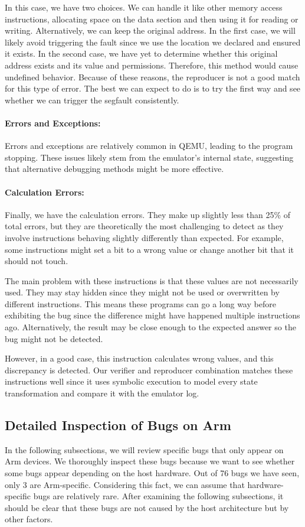 In this case, we have two choices.
We can handle it like other memory access instructions, allocating space on the data section and then using it for reading or writing.
Alternatively, we can keep the original address.
In the first case, we will likely avoid triggering the fault since we use the location we declared and ensured it exists.
In the second case, we have yet to determine whether this original address exists and its value and permissions.
Therefore, this method would cause undefined behavior.
Because of these reasons, the reproducer is not a good match for this type of error.
The best we can expect to do is to try the first way and see whether we can trigger the \ac{segfault} consistently.

\paragraph{Errors and Exceptions:}
Errors and exceptions are relatively common in \ac{QEMU}, leading to the program stopping. These issues likely stem from the emulator's internal state, suggesting that alternative debugging methods might be more effective.

\paragraph{Calculation Errors:}
Finally, we have the calculation errors.
They make up slightly less than 25\% of total errors, but they are theoretically the most challenging to detect as they involve instructions behaving slightly differently than expected.
For example, some instructions might set a bit to a wrong value or change another bit that it should not touch.

The main problem with these instructions is that these values are not necessarily used.
They may stay hidden since they might not be used or overwritten by different instructions.
This means these programs can go a long way before exhibiting the bug since the difference might have happened multiple instructions ago.
Alternatively, the result may be close enough to the expected answer so the bug might not be detected.

However, in a good case, this instruction calculates wrong values, and this discrepancy is detected.
Our verifier and reproducer combination matches these instructions well since it uses symbolic execution to model every state transformation and compare it with the emulator log.

\subsection{Detailed Inspection of Bugs on Arm}
In the following subsections, we will review specific bugs that only appear on Arm devices.
We thoroughly inspect these bugs because we want to see whether some bugs appear depending on the host hardware.
Out of 76 bugs we have seen, only 3 are Arm-specific.
Considering this fact, we can assume that hardware-specific bugs are relatively rare.
After examining the following subsections, it should be clear that these bugs are not caused by the host architecture but by other factors.

